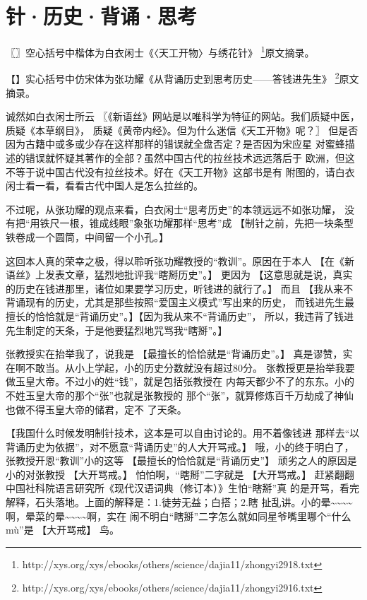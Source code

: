 \chapter{针·历史·背诵·思考}

\subtitle{——致白衣闲士兼答张功耀}

\kaishu
〖〗空心括号中楷体为白衣闲士《〈天工开物〉与绣花针》
\footnote{http://xys.org/xys/ebooks/others/science/dajia11/zhongyi2918.txt}原文摘录。

\fangsong
【】实心括号中仿宋体为张功耀《从背诵历史到思考历史——答钱进先生》
\footnote{http://xys.org/xys/ebooks/others/science/dajia11/zhongyi2916.txt}原文摘录。

\normalfont
诚然如白衣闲士所云
\kaishu
〖《新语丝》网站是以唯科学为特征的网站。我们质疑中医，质疑《本草纲目》，
质疑《黄帝内经》。但为什么迷信《天工开物》呢？〗
\normalfont
但是否因为古籍中或多或少存在这样那样的错误就全盘否定？是否因为宋应星
对蜜蜂描述的错误就怀疑其著作的全部？虽然中国古代的拉丝技术远远落后于
欧洲，但这不等于说中国古代没有拉丝技术。好在《天工开物》这部书是有
附图的，请白衣闲士看一看，看看古代中国人是怎么拉丝的。

不过呢，从张功耀的观点来看，白衣闲士“思考历史”的本领远远不如张功耀，
没有把“用铁尺一根，锥成线眼”象张功耀那样“思考”成
\fangsong
【制针之前，先把一块条型铁卷成一个圆筒，中间留一个小孔。】

\normalfont
这回本人真的荣幸之极，得以聆听张功耀教授的“教训”。原因在于本人
\fangsong
【在《新语丝》上发表文章，猛烈地批评我“瞎掰历史”。】
\normalfont
更因为
\fangsong
【这意思就是说，真实的历史在钱进那里，诸位如果要学习历史，听钱进的就行了。】
\normalfont
而且
\fangsong
【我从来不背诵现有的历史，尤其是那些按照“爱国主义模式”写出来的历史，
而钱进先生最擅长的恰恰就是“背诵历史”。】【因为我从来不“背诵历史”，
所以，我违背了钱进先生制定的天条，于是他要猛烈地咒骂我“瞎掰”。】

\normalfont
张教授实在抬举我了，说我是
\fangsong
【最擅长的恰恰就是“背诵历史”。】
\normalfont
真是谬赞，实在啊不敢当。从小上学起，小的历史分数就没有超过80分。
张教授更是抬举我要做玉皇大帝。不过小的姓“钱”，就是包括张教授在
内每天都少不了的东东。小的不姓玉皇大帝的那个“张”也就是张教授的
那个“张”，就算修炼百千万劫成了神仙也做不得玉皇大帝的储君，定不
了天条。

\fangsong
【我国什么时候发明制针技术，这本是可以自由讨论的。用不着像钱进
那样去“以背诵历史为依据”，对不愿意“背诵历史”的人大开骂戒。】
\normalfont
哦，小的终于明白了，张教授开恩“教训”小的这等
\fangsong
【最擅长的恰恰就是“背诵历史”】
\normalfont
顽劣之人的原因是小的对张教授
\fangsong
【大开骂戒。】
\normalfont
怕怕啊，“瞎掰”二字就是
\fangsong
【大开骂戒。】
\normalfont
赶紧翻翻中国社科院语言研究所《现代汉语词典（修订本）》生怕“瞎掰”真
的是开骂，看完解释，石头落地。上面的解释是：1.徒劳无益；白搭；2.瞎
扯乱讲。小的晕\~{}\~{}\~{}\~{}啊，晕菜的晕\~{}\~{}\~{}\~{}啊，实在
闹不明白“瞎掰”二字怎么就如同星爷嘴里哪个“什么mù”是
\fangsong
【大开骂戒】
\normalfont
鸟。

